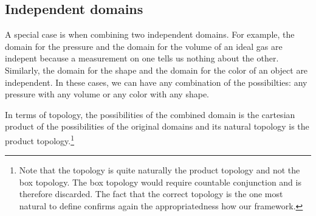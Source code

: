 \documentclass[11pt,letterpaper,fleqn]{memoir} %
\begin{document}
\subsection{Independent domains}

A special case is when combining two independent domains. For example, the domain for the pressure and the domain for the volume of an ideal gas are indepent because a measurement on one tells us nothing about the other. Similarly, the domain for the shape and the domain for the color of an object are independent. In these cases, we can have any combination of the possibilties: any pressure with any volume or any color with any shape.

In terms of topology, the possibilities of the combined domain is the cartesian product of the possibilities of the original domains and its natural topology is the product topology.\footnote{Note that the topology is quite naturally the product topology and not the box topology. The box topology would require countable conjunction and is therefore discarded. The fact that the correct topology is the one most natural to define confirms again the appropriatedness how our framework.}
\end{document}
